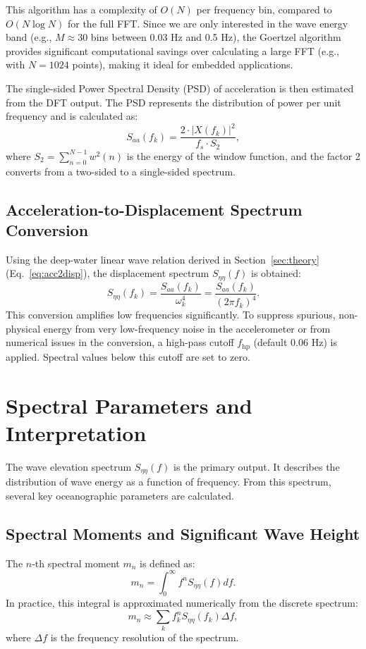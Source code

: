 \documentclass[11pt]{article}
\begin{document}
This algorithm has a complexity of $O(N)$ per frequency bin, compared to $O(N \log N)$ for the full FFT. Since we are only interested in the wave energy band (e.g., $M \approx 30$ bins between 0.03 Hz and 0.5 Hz), the Goertzel algorithm provides significant computational savings over calculating a large FFT (e.g., with $N=1024$ points), making it ideal for embedded applications.

The single-sided Power Spectral Density (PSD) of acceleration is then estimated from the DFT output. The PSD represents the distribution of power per unit frequency and is calculated as:
\begin{equation}
S_{aa}(f_k) = \frac{2 \cdot |X(f_k)|^2}{f_s \cdot S_2},
\end{equation}
where $S_2 = \sum_{n=0}^{N-1} w^2(n)$ is the energy of the window function, and the factor 2 converts from a two-sided to a single-sided spectrum.

\subsection{Acceleration-to-Displacement Spectrum Conversion}
Using the deep-water linear wave relation derived in Section~\ref{sec:theory} (Eq.~\ref{eq:acc2disp}), the displacement spectrum $S_{\eta\eta}(f)$ is obtained:
\begin{equation}
S_{\eta\eta}(f_k) = \frac{S_{aa}(f_k)}{\omega_k^4} = \frac{S_{aa}(f_k)}{(2\pi f_k)^4}.
\end{equation}
This conversion amplifies low frequencies significantly. To suppress spurious, non-physical energy from very low-frequency noise in the accelerometer or from numerical issues in the conversion, a high-pass cutoff $f_\text{hp}$ (default $0.06$ Hz) is applied. Spectral values below this cutoff are set to zero.

\section{Spectral Parameters and Interpretation}
\label{sec:params}
The wave elevation spectrum $S_{\eta\eta}(f)$ is the primary output. It describes the distribution of wave energy as a function of frequency. From this spectrum, several key oceanographic parameters are calculated.

\subsection{Spectral Moments and Significant Wave Height}
The $n$-th spectral moment $m_n$ is defined as:
\begin{equation}
m_n = \int_{0}^{\infty} f^n S_{\eta\eta}(f)  df.
\end{equation}
In practice, this integral is approximated numerically from the discrete spectrum:
\begin{equation}
m_n \approx \sum_{k} f_k^n S_{\eta\eta}(f_k) \Delta f,
\end{equation}
where $\Delta f$ is the frequency resolution of the spectrum.
\end{document}
